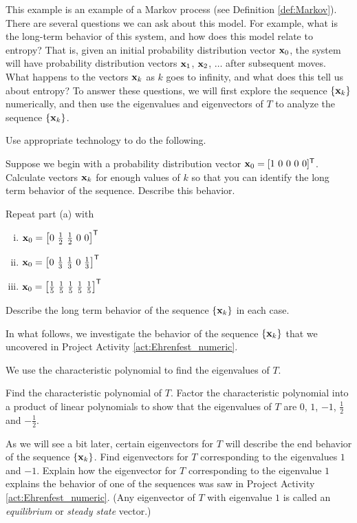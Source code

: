 This example is an example of a Markov process (see Definition \ref{def:Markov}). There are several questions we can ask about this model. For example, what is the long-term behavior of this system, and how does this model relate to entropy? That is, given an initial probability distribution vector $\mathbf{x}_0$, the system will have probability distribution vectors $\mathbf{x}_1$, $\mathbf{x}_2$, $\ldots$ after subsequent moves. What happens to the vectors $\mathbf{x}_k$ as $k$ goes to infinity, and what does this tell us about entropy? To answer these questions, we will first explore the sequence $\{\mathbf{x}_k\}$ numerically, and then use the eigenvalues and eigenvectors of $T$ to analyze the sequence $\{\mathbf{x}_k\}$. 

\begin{pactivity} \label{act:Ehrenfest_numeric} Use appropriate technology to do the following.
	\ba
	\item Suppose we begin with a probability distribution vector $\mathbf{x}_0 = [1 \ 0 \ 0 \ 0 \ 0]^{\mathsf{T}}$. Calculate vectors $\mathbf{x}_k$ for enough values of $k$ so that you can identify the long term behavior of the sequence. Describe this behavior.
	
	\item Repeat part (a) with 
	\begin{enumerate}[i.]
	\item $\vx_0 = \left[0 \ \frac{1}{2} \ \frac{1}{2} \ 0 \ 0\right]^{\tr}$
	\item $\vx_0 = \left[0 \ \frac{1}{3} \ \frac{1}{3} \ 0 \ \frac{1}{3}\right]^{\tr}$
	\item $\vx_0 = \left[\frac{1}{5} \ \frac{1}{5} \ \frac{1}{5} \ \frac{1}{5} \ \frac{1}{5}\right]^{\tr}$
	\end{enumerate}
	Describe the long term behavior of the sequence $\{\mathbf{x}_k\}$ in each case. 
	

	\ea
	
\end{pactivity}

In what follows, we investigate the behavior of the sequence $\{\mathbf{x}_k\}$ that we uncovered in Project Activity \ref{act:Ehrenfest_numeric}.

\begin{pactivity} \label{act:Ehrenfest_eigenvalues} We use the characteristic polynomial to find the eigenvalues of $T$.  
    \ba
    \item Find the characteristic polynomial of $T$. Factor the characteristic polynomial into a product of linear polynomials to show that the eigenvalues of $T$ are $0$, $1$, $-1$, $\frac{1}{2}$ and $-\frac{1}{2}$. 
    

	\item As we will see a bit later, certain eigenvectors for $T$ will describe the end behavior of the sequence $\{\mathbf{x}_k\}$. Find eigenvectors for $T$ corresponding to the eigenvalues $1$ and $-1$. Explain how the eigenvector for $T$ corresponding to the eigenvalue $1$ explains the behavior of one of the sequences was saw in Project Activity \ref{act:Ehrenfest_numeric}. (Any eigenvector of $T$ with eigenvalue $1$ is called an \emph{equilibrium} or \emph{steady state} vector.) 


\ea
\end{pactivity}

